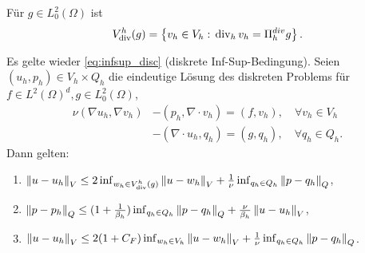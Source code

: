   \begin{definition} Für $g \in L_{0}^{2} (\Omega)$ ist
    \begin{align*}
      V_{\operatorname{div}}^{h}(g) = \left\{ v_{h} \in V_{h}: \, \operatorname{div}_{h} v_{h} =
        \Pi_{h}^{div}g \right\}.
    \end{align*}
  \end{definition}
  \begin{lemma}\label{lem:2-27}
    Es gelte wieder \eqref{eq:infsup_disc} (diskrete
    Inf-Sup-Bedingung). Seien $(u_{h}, p_{h}) \in V_{h} \times Q_{h}$
    die eindeutige Lösung des diskreten Problems für $f\in
    L^{2}(\Omega)^{d}, g \in L_{0}^{2}(\Omega)$,
    \begin{align*}
      \nu(\nabla u_{h}, \nabla v_{h}) &- (p_{h}, \nabla\cdot v_{h}) = (f, v_{h}), \quad \forall v_{h} \in V_{h}\\
      &- (\nabla\cdot u_{h},q_{h}) = (g, q_{h}), \quad \forall q_{h}
      \in Q_{h}.
    \end{align*}
    Dann gelten:
    \begin{enumerate}
    \item $\left \|u - u_{h} \right\|_{V} \leq 2 \inf_{w_{h} \in
        V_{\operatorname{div}}^{h}(g)} \left \|u - w_{h} \right\|_{V} + \frac 1 \nu
      \inf_{q_{h} \in Q_{h}}\left \|p - q_{h} \right\|_{Q}$,
    \item $\left \|p - p_{h} \right\|_{Q} \leq (1 + \frac 1 {\beta_{h}})
      \inf_{q_{h} \in Q_{h}} \left \|p - q_{h} \right\|_{Q} + \frac \nu
      {\beta_{h}} \left \|u - u_{h} \right\|_{V}$,
    \item $\left \|u - u_{h} \right\|_{V} \leq 2 (1 + C_{F}) \inf_{w_{h} \in
        V_{h}} \left \|u - w_{h} \right\|_{V} + \frac 1 \nu \inf_{q_{h} \in
        Q_{h}}\left \|p - q_{h} \right\|_{Q}$.
    \end{enumerate}
  \end{lemma}
